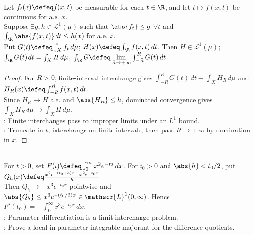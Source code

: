\begin{corollary} \label{cor:improper-riemann-parameter-integral-interchange} \\
Let $f_t(x)\defeq f(x,t)$ be measurable for each $t\in\R$, and let $t\mapsto f(x,t)$ be continuous for a.e. $x$.\\
Suppose $\exists g,h\in\mathscr{L}^1(\mu)$ such that $\abs{f_t}\leq g$ $\forall t$ and $\int_\R\abs{f(x,t)}\,dt\leq h(x)$ for a.e. $x$.\\
Put $G(t)\defeq\int_Xf_t\,d\mu$; $H(x)\defeq\int_\R f(x,t)\,dt$. Then $H\in\mathscr{L}^1(\mu)$; $\int_\R G(t)\,dt=\int_XH\,d\mu$, $\int_\R G\defeq\lim\limits_{R\to+\infty}\int_{-R}^{R}G(t)\,dt$.
\begin{proof}
For $R>0$, finite-interval interchange gives $\int_{-R}^{R}G(t)\,dt=\int_XH_R\,d\mu$ and $H_R(x)\defeq\int_{-R}^{R}f(x,t)\,dt$.\\
Since $H_R\to H$ a.e. and $\abs{H_R}\leq h$, dominated convergence gives $\int_XH_R\,d\mu\to\int_XH\,d\mu$.\\
: Finite interchanges pass to improper limits under an $L^1$ bound.\\
: Truncate in $t$, interchange on finite intervals, then pass $R\to+\infty$ by domination in $x$.
\end{proof}
\end{corollary}

\begin{example} \label{ex:differentiating-under-integral-dominated-convergence} \\
For $t>0$, set $F(t)\defeq\int_0^\infty x^2e^{-tx}\,dx$. For $t_0>0$ and $\abs{h}<t_0/2$, put $Q_h(x)\defeq\frac{x^2e^{-(t_0+h)x}-x^2e^{-t_0x}}{h}$\\
Then $Q_h\to -x^3e^{-t_0x}$ pointwise and $\abs{Q_h}\leq x^3e^{-(t_0/2)x}\in\mathscr{L}^1(0,\infty)$. Hence $F'(t_0)=-\int_0^\infty x^3e^{-t_0x}\,dx$.\\
: Parameter differentiation is a limit-interchange problem.\\
: Prove a local-in-parameter integrable majorant for the difference quotients.
\end{example}

